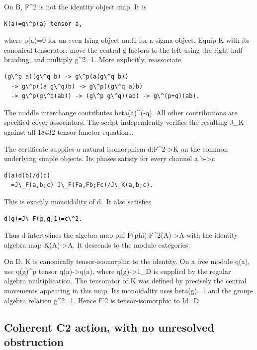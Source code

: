 On B, F\^{}2 is not the identity object map. It is

\begin{verbatim}
K(a)=g\^p(a) tensor a,
\end{verbatim}

where p(a)=0 for an even Ising object and1 for a sigma object. Equip K
with its canonical tensorator: move the central g factors to the left
using the right half-braiding, and multiply g\^{}2=1. More explicitly,
reassociate

\begin{verbatim}
(g\^p a)(g\^q b) -> g\^p(a(g\^q b))
  -> g\^p((a g\^q)b) -> g\^p((g\^q a)b)
  -> g\^p(g\^q(ab)) -> (g\^p g\^q)(ab) -> g\^(p+q)(ab).
\end{verbatim}

The middle interchange contributes beta(a)\^{}(-q). All other
contributions are specified cover associators. The script independently
verifies the resulting J\_K against all 18432 tensor-functor equations.

The certificate supplies a natural isomorphism d:F\^{}2-\textgreater K
on the common underlying simple objects. Its phases satisfy for every
channel a b-\textgreater c

\begin{verbatim}
d(a)d(b)/d(c)
  =J\_F(a,b;c) J\_F(Fa,Fb;Fc)/J\_K(a,b;c).
\end{verbatim}

This is exactly monoidality of d.~It also satisfies

\begin{verbatim}
d(g)=J\_F(g,g;1)=c\^2.
\end{verbatim}

Thus d intertwines the algebra map phi F(phi):F\^{}2(A)-\textgreater A
with the identity algebra map K(A)-\textgreater A. It descends to the
module categories.

On D, K is canonically tensor-isomorphic to the identity. On a free
module q(a), use q(g)\^{}p tensor q(a)-\textgreater q(a), where
q(g)-\textgreater1\_D is supplied by the regular algebra multiplication.
The tensorator of K was defined by precisely the central movements
appearing in this map. Its monoidality uses beta(g)=1 and the
group-algebra relation g\^{}2=1. Hence f\^{}2 is tensor-isomorphic to
Id\_D.

\hypertarget{coherent-c2-action-with-no-unresolved-obstruction}{%
\subsection{Coherent C2 action, with no unresolved
obstruction}\label{coherent-c2-action-with-no-unresolved-obstruction}}

